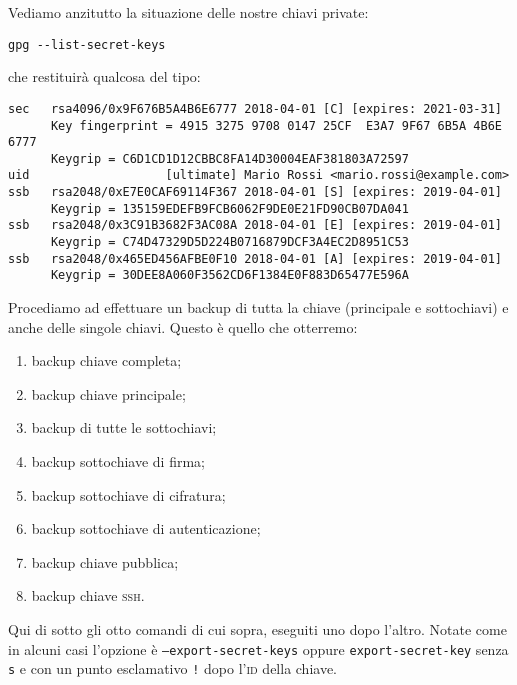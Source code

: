 \documentclass[a4paper,10pt]{article}
\begin{document}
Vediamo anzitutto la situazione delle nostre chiavi private:

\begin{lstlisting}
gpg --list-secret-keys
\end{lstlisting}

che restituirà qualcosa del tipo:

\begin{lstlisting}
sec   rsa4096/0x9F676B5A4B6E6777 2018-04-01 [C] [expires: 2021-03-31]
      Key fingerprint = 4915 3275 9708 0147 25CF  E3A7 9F67 6B5A 4B6E 6777
      Keygrip = C6D1CD1D12CBBC8FA14D30004EAF381803A72597
uid                   [ultimate] Mario Rossi <mario.rossi@example.com>
ssb   rsa2048/0xE7E0CAF69114F367 2018-04-01 [S] [expires: 2019-04-01]
      Keygrip = 135159EDEFB9FCB6062F9DE0E21FD90CB07DA041
ssb   rsa2048/0x3C91B3682F3AC08A 2018-04-01 [E] [expires: 2019-04-01]
      Keygrip = C74D47329D5D224B0716879DCF3A4EC2D8951C53
ssb   rsa2048/0x465ED456AFBE0F10 2018-04-01 [A] [expires: 2019-04-01]
      Keygrip = 30DEE8A060F3562CD6F1384E0F883D65477E596A
\end{lstlisting}

Procediamo ad effettuare un backup di tutta la chiave (principale e sottochiavi) e anche delle singole chiavi. Questo è quello che otterremo:

\begin{enumerate}
 \item backup chiave completa;
 \item backup chiave principale;
 \item backup di tutte le sottochiavi;
 \item backup sottochiave di firma;
 \item backup sottochiave di cifratura;
 \item backup sottochiave di autenticazione;
 \item backup chiave pubblica;
 \item backup chiave \textsc{ssh}.
\end{enumerate}


Qui di sotto gli otto comandi di cui sopra, eseguiti uno dopo l'altro. Notate come in alcuni casi l'opzione è \texttt{--export-secret-keys} oppure \texttt{export-secret-key} senza \texttt{s} e con un punto esclamativo \texttt{!} dopo l'\textsc{id} della chiave.
\end{document}
